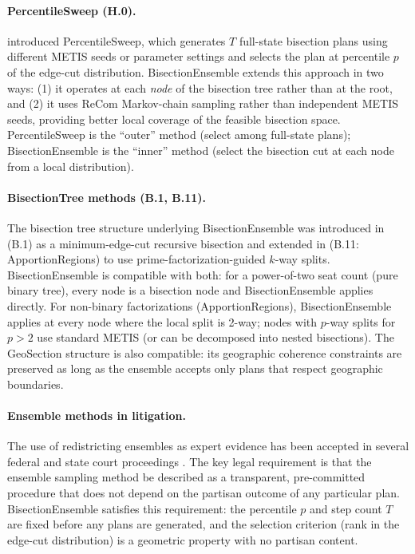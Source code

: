 \paragraph{PercentileSweep (H.0).}
\citet{dellaLibera2026percentilesweep} introduced PercentileSweep, which
generates $T$ full-state bisection plans using different METIS seeds or
parameter settings and selects the plan at percentile $p$ of the edge-cut
distribution. BisectionEnsemble extends this approach in two ways: (1) it
operates at each \emph{node} of the bisection tree rather than at the root,
and (2) it uses ReCom Markov-chain sampling rather than independent METIS
seeds, providing better local coverage of the feasible bisection space.
PercentileSweep is the ``outer'' method (select among full-state plans);
BisectionEnsemble is the ``inner'' method (select the bisection cut at each
node from a local distribution).

\paragraph{BisectionTree methods (B.1, B.11).}
The bisection tree structure underlying BisectionEnsemble was introduced in
\citet{dellaLibera2026mec} (B.1) as a minimum-edge-cut recursive bisection
and extended in \citet{dellaLibera2026apportion} (B.11: ApportionRegions)
to use prime-factorization-guided $k$-way splits. BisectionEnsemble is
compatible with both: for a power-of-two seat count (pure binary tree),
every node is a bisection node and BisectionEnsemble applies directly. For
non-binary factorizations (ApportionRegions), BisectionEnsemble applies
at every node where the local split is 2-way; nodes with $p$-way splits
for $p > 2$ use standard METIS (or can be decomposed into nested bisections).
The GeoSection structure \citep{dellaLibera2026geosection} is also compatible:
its geographic coherence constraints are preserved as long as the ensemble
accepts only plans that respect geographic boundaries.

\paragraph{Ensemble methods in litigation.}
The use of redistricting ensembles as expert evidence has been accepted in
several federal and state court proceedings \citep{herschlag2020quantifying,
duchin2021report}. The key legal requirement is that the ensemble sampling
method be described as a transparent, pre-committed procedure that does not
depend on the partisan outcome of any particular plan. BisectionEnsemble
satisfies this requirement: the percentile $p$ and step count $T$ are fixed
before any plans are generated, and the selection criterion (rank in the
edge-cut distribution) is a geometric property with no partisan content.
